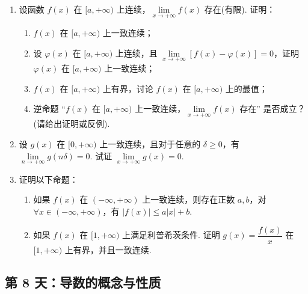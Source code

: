 \begin{enumerate}[label=\textbf{\arabic*.}, itemsep=4.5cm, resume]
    \item 设函数 $f(x)$ 在 $[a, +\infty)$ 上连续，$\lim\limits_{x \to +\infty} f(x)$ 存在(有限). 证明：
    \begin{enumerate}[label=(\arabic*), itemsep=3.5cm]
        \item $f(x)$ 在 $[a, +\infty)$ 上一致连续；
        \item 设 $\varphi(x)$ 在 $[a, +\infty)$ 上连续，且 $\lim\limits_{x \to +\infty} [f(x) - \varphi(x)] = 0$，证明 $\varphi(x)$ 在 $[a, +\infty)$ 上一致连续；
        \item $f(x)$ 在 $[a, +\infty)$ 上有界，讨论 $f(x)$ 在 $[a, +\infty)$ 上的最值；
        \item 逆命题 “$f(x)$ 在 $[a, +\infty)$ 上一致连续，$\lim\limits_{x \to +\infty} f(x)$ 存在” 是否成立？(请给出证明或反例).
    \end{enumerate}

    \item 设 $g(x)$ 在 $[0, +\infty)$ 上一致连续，且对于任意的 $\delta \ge 0$，有 $\lim\limits_{n \to +\infty} g(n\delta) = 0$. 试证 $\lim\limits_{x \to +\infty} g(x) = 0$.

    \item 证明以下命题：
    \begin{enumerate}[label=(\arabic*), itemsep=6.5cm]
        \item 如果 $f(x)$ 在 $(-\infty, +\infty)$ 上一致连续，则存在正数 $a, b$，对 $\forall x \in (-\infty, +\infty)$，有 $|f(x)| \le a|x| + b$.
        \item 如果 $f(x)$ 在 $[1, +\infty)$ 上满足利普希茨条件. 证明 $g(x) = \dfrac{f(x)}{x}$ 在 $[1, +\infty)$ 上有界，并且一致连续.
    \end{enumerate}
\end{enumerate}

\newpage
\subsection*{第 8 天：导数的概念与性质}

